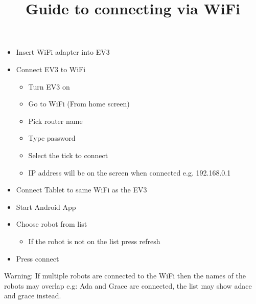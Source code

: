 \documentclass{article}
\title{Guide to connecting via WiFi}
\begin{document}
	\maketitle
	\begin{itemize}
		\item Insert WiFi adapter into EV3
		\item Connect EV3 to WiFi
		\begin{itemize}
			\item Turn EV3 on
			\item Go to WiFi (From home screen)
			\item Pick router name
			\item Type password
			\item Select the tick to connect
			\item IP address will be on the screen when connected e.g. 192.168.0.1
		\end{itemize}
		\item Connect Tablet to same WiFi as the EV3
		\item Start Android App
		\item Choose robot from list
		\begin{itemize}
			\item If the robot is not on the list press refresh
		\end{itemize}
		\item Press connect
	\end{itemize}
	Warning: If multiple robots are connected to the WiFi then the names of the robots may overlap
	e.g: Ada and Grace are connected, the list may show adace and grace instead.
\end{document}
